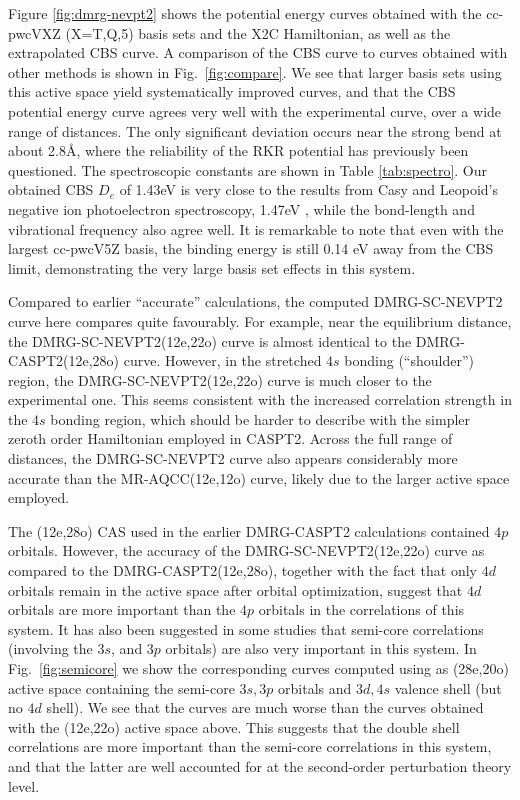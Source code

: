 Figure \ref{fig:dmrg-nevpt2} shows the potential energy curves obtained with the cc-pwcVXZ (X=T,Q,5) basis sets and the X2C Hamiltonian, as well as the extrapolated
CBS curve. A comparison of the CBS curve to curves obtained with other
methods is shown in Fig.~\ref{fig:compare}.
We see that larger basis sets using this active space yield systematically improved curves, and that
the CBS potential energy curve agrees very well with the experimental curve, over a wide range of distances. The only significant deviation occurs near the strong bend at about 2.8\AA, where the reliability of the RKR potential  has previously been questioned.\cite{roos_ground_2003}
The spectroscopic constants are shown in Table \ref{tab:spectro}.
Our obtained CBS $D_e$ of 1.43eV is very close to the results from Casy and Leopoid's negative ion photoelectron spectroscopy,
1.47eV \cite{casey_negative_1993}, while the bond-length and vibrational frequency also agree well. It is remarkable to note that even
with the largest cc-pwcV5Z basis, the binding energy is still 0.14 eV away from the CBS limit,  demonstrating the very large basis set 
effects in this system.  

Compared to earlier ``accurate'' calculations, the computed DMRG-SC-NEVPT2 curve 
here compares  quite favourably. For example, near the equilibrium
distance, the DMRG-SC-NEVPT2(12e,22o) curve is almost identical to the DMRG-CASPT2(12e,28o) curve\cite{kurashige_second-order_2011}. However, in the stretched $4s$ bonding (``shoulder'') region, the DMRG-SC-NEVPT2(12e,22o) curve is much closer to the experimental one. This seems consistent with the increased correlation strength in the $4s$ bonding region, which should be harder to describe with the simpler zeroth order Hamiltonian employed in CASPT2. Across the full range of distances, the DMRG-SC-NEVPT2 curve also appears considerably more accurate than the MR-AQCC(12e,12o) curve, likely due to the larger active space employed.

The (12e,28o) CAS used in the earlier DMRG-CASPT2 calculations 
contained $4p$ orbitals. However, the accuracy of the DMRG-SC-NEVPT2(12e,22o) curve as compared to the DMRG-CASPT2(12e,28o), together with the fact that only $4d$ orbitals remain in the active space after orbital optimization, suggest that $4d$ orbitals are more important than the $4p$ orbitals in the correlations of this system. It has also been suggested in some studies
that semi-core correlations (involving the $3s$, and $3p$ orbitals) are also very important in this system. In Fig.~\ref{fig:semicore} we show the corresponding curves
computed using as (28e,20o) active space containing the semi-core $3s, 3p$ orbitals and $3d, 4s$ valence shell (but no $4d$ shell). We see that the curves are much worse than the curves obtained with the (12e,22o) active space above. This 
suggests that the double shell correlations are more important than 
the semi-core correlations in this system, and that the latter are well accounted for at the second-order perturbation theory level.

